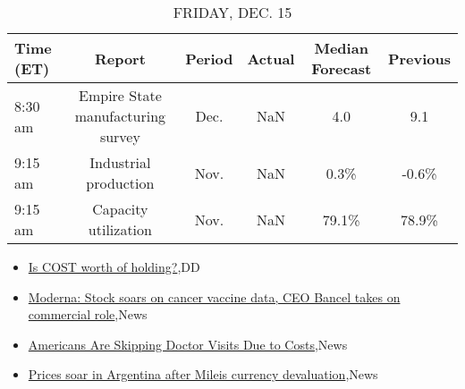 \documentclass{article}%
\begin{document}
%


\begin{table}[htbp]%
\caption{FRIDAY, DEC. 15}%
\centering%
\begin{adjustbox}{width=1\textwidth}%
\begin{tabular}{lccccc}
\toprule
Time (ET) &                            Report & Period & Actual & Median Forecast & Previous \\
\midrule
  8:30 am & Empire State manufacturing survey &   Dec. &    NaN &             4.0 &      9.1 \\
  9:15 am &             Industrial production &   Nov. &    NaN &            0.3\% &    -0.6\% \\
  9:15 am &              Capacity utilization &   Nov. &    NaN &           79.1\% &    78.9\% \\
\bottomrule
\end{tabular}
%
\end{adjustbox}%
\end{table}

%
\begin{itemize}%
\item%
\href{https://reddit.com/r/wallstreetbets/comments/18iuxgg/is\_cost\_worth\_of\_holding/}{Is COST worth of holding?},DD%
\item%
\href{https://reddit.com/r/StockMarket/comments/18ifgmd/moderna\_stock\_soars\_on\_cancer\_vaccine\_data\_ceo/}{Moderna: Stock soars on cancer vaccine data, CEO Bancel takes on commercial role},News%
\item%
\href{https://reddit.com/r/Economics/comments/18ilm66/americans\_are\_skipping\_doctor\_visits\_due\_to\_costs/}{Americans Are Skipping Doctor Visits Due to Costs},News%
\item%
\href{https://reddit.com/r/Economics/comments/18ii93v/prices\_soar\_in\_argentina\_after\_mileis\_currency/}{Prices soar in Argentina after Mileis currency devaluation},News%
\end{itemize}%
\end{document}
